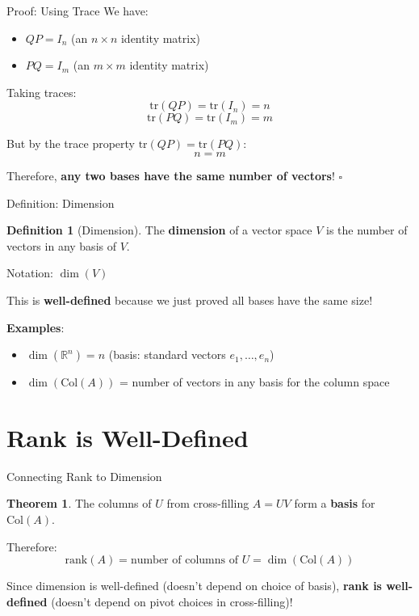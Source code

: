 \documentclass[10pt]{beamer}
\theoremstyle{definition}
\newtheorem{defi}{Definition}[section]
\newtheorem{thm}{Theorem}[section]
\newcommand{\x}[1]{\alert{\textbf{#1}}}
\begin{document}
\begin{frame}{Proof: Using Trace}
We have:
\begin{itemize}
\item $QP = I_n$ (an $n \times n$ identity matrix)
\item $PQ = I_m$ (an $m \times m$ identity matrix)
\end{itemize}

\vfill
Taking traces:
$$\text{tr}(QP) = \text{tr}(I_n) = n$$
$$\text{tr}(PQ) = \text{tr}(I_m) = m$$

\vfill
But by the trace property $\text{tr}(QP) = \text{tr}(PQ)$:
$$n = m$$

\vfill
Therefore, \x{any two bases have the same number of vectors}! $\square$
\end{frame}

\begin{frame}{Definition: Dimension}
\begin{defi}[Dimension]
The \x{dimension} of a vector space $V$ is the number of vectors in any basis of $V$.

Notation: $\dim(V)$
\end{defi}

\vfill
This is \x{well-defined} because we just proved all bases have the same size!

\vfill
\x{Examples}:
\begin{itemize}
\item $\dim(\mathbb{R}^n) = n$ (basis: standard vectors $e_1, \ldots, e_n$)
\item $\dim(\text{Col}(A))$ = number of vectors in any basis for the column space
\end{itemize}
\end{frame}

\section{Rank is Well-Defined}

\begin{frame}{Connecting Rank to Dimension}
\begin{thm}
The columns of $U$ from cross-filling $A = UV$ form a \x{basis} for $\text{Col}(A)$.
\end{thm}

\vfill
Therefore:
$$\text{rank}(A) = \text{number of columns of } U = \dim(\text{Col}(A))$$

\vfill
Since dimension is well-defined (doesn't depend on choice of basis), \x{rank is well-defined} (doesn't depend on pivot choices in cross-filling)!
\end{frame}
\end{document}
